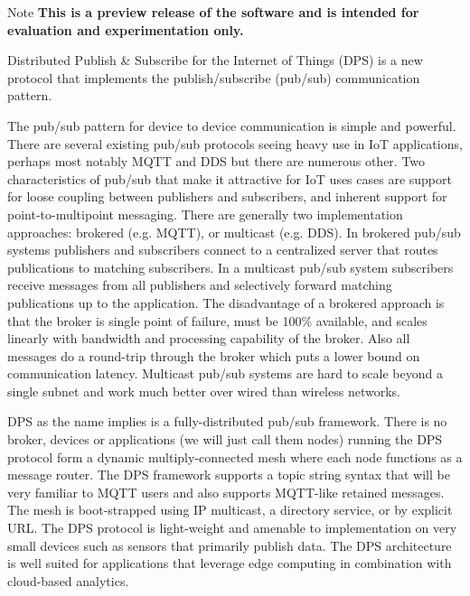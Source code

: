 \begin{DoxyNote}{Note}
{\bfseries This is a preview release of the software and is intended for evaluation and experimentation only.}
\end{DoxyNote}
Distributed Publish \& Subscribe for the Internet of Things (D\+PS) is a new protocol that implements the publish/subscribe (pub/sub) communication pattern.

The pub/sub pattern for device to device communication is simple and powerful. There are several existing pub/sub protocols seeing heavy use in IoT applications, perhaps most notably M\+Q\+TT and D\+DS but there are numerous other. Two characteristics of pub/sub that make it attractive for IoT uses cases are support for loose coupling between publishers and subscribers, and inherent support for point-\/to-\/multipoint messaging. There are generally two implementation approaches\+: brokered (e.\+g. M\+Q\+TT), or multicast (e.\+g. D\+DS). In brokered pub/sub systems publishers and subscribers connect to a centralized server that routes publications to matching subscribers. In a multicast pub/sub system subscribers receive messages from all publishers and selectively forward matching publications up to the application. The disadvantage of a brokered approach is that the broker is single point of failure, must be 100\% available, and scales linearly with bandwidth and processing capability of the broker. Also all messages do a round-\/trip through the broker which puts a lower bound on communication latency. Multicast pub/sub systems are hard to scale beyond a single subnet and work much better over wired than wireless networks.

D\+PS as the name implies is a fully-\/distributed pub/sub framework. There is no broker, devices or applications (we will just call them nodes) running the D\+PS protocol form a dynamic multiply-\/connected mesh where each node functions as a message router. The D\+PS framework supports a topic string syntax that will be very familiar to M\+Q\+TT users and also supports M\+Q\+T\+T-\/like retained messages. The mesh is boot-\/strapped using IP multicast, a directory service, or by explicit U\+RL. The D\+PS protocol is light-\/weight and amenable to implementation on very small devices such as sensors that primarily publish data. The D\+PS architecture is well suited for applications that leverage edge computing in combination with cloud-\/based analytics.

